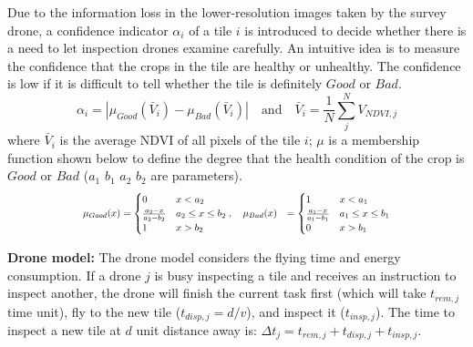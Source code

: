 \documentclass[runningheads]{llncs}
\begin{document}
Due to the information loss in the lower-resolution images taken by the survey drone, a confidence indicator $\alpha_i$ of a tile $i$ is introduced to decide whether there is a need to let inspection drones examine carefully. An intuitive idea is to measure the confidence that the crops in the tile are healthy or unhealthy. The confidence is low if it is difficult to tell whether the tile is definitely $Good$ or $Bad$.
\begin{equation}
    \alpha_i = | \mu_{Good}(\bar{V}_i) - \mu_{Bad}(\bar{V}_i) | \quad \textrm{and} \quad
    \bar{V}_i = \frac{1}{N} \sum_j^{N} V_{NDVI,j}
\end{equation}
where $\bar{V}_i$ is the average NDVI of all pixels of the tile $i$; 
$\mu$ is a membership function shown below to define the degree that the health condition of the crop is $Good$ or $Bad$ ($a_1$ $b_1$ $a_2$ $b_2$ are parameters).
\begin{equation}
    \resizebox{.7\linewidth}{!}{$
    \begin{aligned}
        \mu_{Good}(x) &=
        \begin{cases}
          0 & \text{$x < a_2$}\\
          \frac{a_2-x}{a_2-b_2} & \text{$a_2 \leq x \leq b_2$}\\
          1 & \text{$x > b_2$}
        \end{cases}
        ,\quad
        \mu_{Bad}(x) &=
        \begin{cases}
          1 & \text{$x < a_1$}\\
          \frac{a_1-x}{a_1-b_1} & \text{$a_1 \leq x \leq b_1$}\\
          0 & \text{$x > b_1$}
        \end{cases}
    \end{aligned}
    $}
\end{equation}




\vspace{.2cm}
\noindent\textbf{Drone model:} The drone model considers the flying time and energy consumption. 
If a drone $j$ is busy inspecting a tile and receives an instruction to inspect another, the drone will finish the current task first (which will take $t_{rem,j}$ time unit), fly to the new tile ($t_{disp,j} = d/v$), and inspect it ($t_{insp,j}$).
The time to inspect a new tile at $d$ unit distance away is: 
$\Delta t_j = t_{rem,j} + t_{disp,j} + t_{insp,j}$.


\vspace{.2cm}
\end{document}
